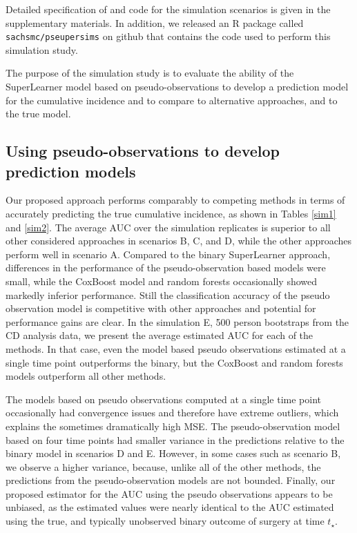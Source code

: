 \documentclass{statsoc}
\begin{document}
Detailed specification of and code for the simulation scenarios is given in the supplementary materials. In addition, we released an R package called \texttt{sachsmc/pseupersims} on github that contains the code used to perform this simulation study. 

The purpose of the simulation study is to evaluate the ability of the SuperLearner model based on pseudo-observations to develop a prediction model for the cumulative incidence and to compare to alternative approaches, and to the true model. 

\subsection{Using pseudo-observations to develop prediction models}  

Our proposed approach performs comparably to competing methods in terms of accurately predicting the true cumulative incidence, as shown in Tables \ref{sim1} and \ref{sim2}. The average AUC over the simulation replicates is superior to all other considered approaches in scenarios B, C, and D, while the other approaches perform well in scenario A. Compared to the binary SuperLearner approach, differences in the performance of the pseudo-observation based models were small, while the CoxBoost model and random forests occasionally showed markedly inferior performance. Still the classification accuracy of the pseudo observation model is competitive with other approaches and potential for performance gains are clear. In the simulation E, 500 person bootstraps from the CD analysis data, we present the average estimated AUC for each of the methods. In that case, even the model based pseudo observations estimated at a single time point outperforms the binary, but the CoxBoost and random forests models outperform all other methods. 

 The models based on pseudo observations computed at a single time point occasionally had convergence issues and therefore have extreme outliers, which explains the sometimes dramatically high MSE. The pseudo-observation model based on four time points had smaller variance in the predictions relative to the binary model in scenarios D and E. However, in some cases such as scenario B, we observe a higher variance, because, unlike all of the other methods, the predictions from the pseudo-observation models are not bounded. Finally, our proposed estimator for the AUC using the pseudo observations appears to be unbiased, as the estimated values were nearly identical to the AUC estimated using the true, and typically unobserved binary outcome of surgery at time $t_{\star}$. 
\end{document}
